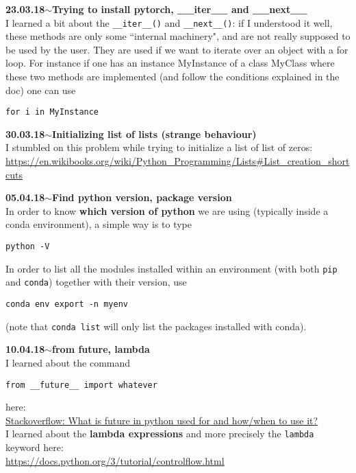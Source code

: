 \documentclass[11pt,a4paper]{article}
\newenvironment{loggentry}[2]%
{\noindent\textbf{#1}\hspace{1cm}$\mathbf{\sim}$\text{ }\textbf{#2}\\}{\vspace{0.5cm}}
\begin{document}
\begin{loggentry}{23.03.18}{Trying to install pytorch, \_\_iter\_\_ and \_\_next\_\_}
I learned a bit about the \texttt{\_\_iter\_\_()} and \texttt{\_\_next\_\_()}: if I understood it well, these methods are only some ``internal machinery", and are not really supposed to be used by the user. They are used if we want to iterate over an object with a for loop. For instance if one has an instance MyInstance of a class MyClass where these two methods are implemented (and follow the conditions explained in the doc) one can use\\
\begin{verbatim}
for i in MyInstance
\end{verbatim}
\end{loggentry}

\begin{loggentry}{30.03.18}{Initializing list of lists (strange behaviour)}
I stumbled on this problem while trying to initialize a list of list of zeros:\\
\url{https://en.wikibooks.org/wiki/Python_Programming/Lists#List_creation_shortcuts}
\end{loggentry}

\begin{loggentry}{05.04.18}{Find python version, package version}
In order to know \textbf{which version of python} we are using (typically inside a conda environment), a simple way is to type
\begin{verbatim}
python -V
\end{verbatim}
In order to list all the modules installed within an environment (with both \texttt{pip} and \texttt{conda}) together with their version, use
\begin{verbatim}
conda env export -n myenv
\end{verbatim}
(note that \texttt{conda list} will only list the packages installed with conda).
\end{loggentry}

\begin{loggentry}{10.04.18}{from future, lambda}
I learned about the command
\begin{verbatim}
from __future__ import whatever
\end{verbatim}
here:\\
\href{https://stackoverflow.com/questions/7075082/what-is-future-in-python-used-for-and-how-when-to-use-it-and-how-it-works#7075121}{Stackoverflow: What is future in python used for and how/when to use it?}\\
I learned about the \textbf{lambda expressions} and more precisely the \texttt{lambda} keyword here:\\
\url{https://docs.python.org/3/tutorial/controlflow.html}\\
\end{loggentry}
\end{document}
